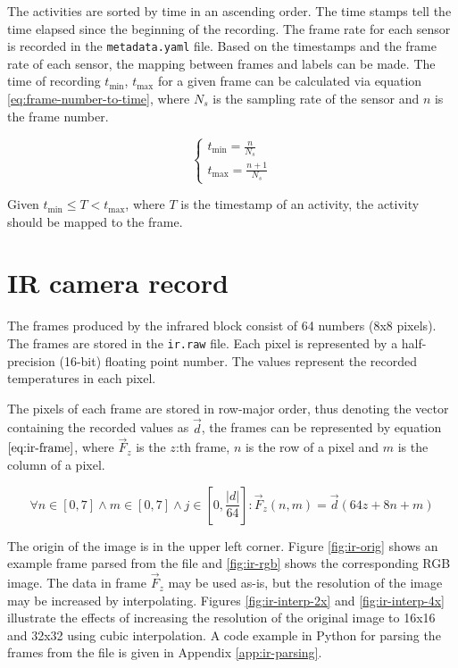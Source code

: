 The activities are sorted by time in an ascending order.
The time stamps tell the time elapsed since the beginning of the recording.
The frame rate for each sensor is recorded in the \texttt{metadata.yaml} file.
Based on the timestamps and the frame rate of each sensor, the mapping between frames and labels can be made.
The time of recording $t_{\mathrm{min}}$, $t_{\mathrm{max}}$ for a given frame can be calculated via equation \ref{eq:frame-number-to-time},
where $N_{s}$ is the sampling rate of the sensor and $n$ is the frame number.

\begin{equation}
    \label{eq:frame-number-to-time}
    \begin{cases}
        t_{\mathrm{min}} = \frac{n}{N_{s}} \\
        t_{\mathrm{max}} = \frac{n+1}{N_{s}}
    \end{cases}
\end{equation}

Given $t_{\mathrm{min}} \leq T < t_{\mathrm{max}}$, where $T$ is the timestamp of an activity, the activity should be mapped to the frame.

\section{IR camera record}
\label{sec:ir-file}
The frames produced by the infrared block consist of 64 numbers (8x8 pixels).
The frames are stored in the \texttt{ir.raw} file.
Each pixel is represented by a half-precision (16-bit) floating point number.
The values represent the recorded temperatures in each pixel.

The pixels of each frame are stored in row-major order,
thus denoting the vector containing the recorded values as $\vec{d}$,
the frames can be represented by equation $\ref{eq:ir-frame}$,
where $\vec{F}_{z}$ is the $z$:th frame, $n$ is the row of a pixel and $m$ is the column of a pixel.

\begin{equation}
    \label{eq:ir-frame}
    \forall n \in [0, 7] \land m \in [0, 7] \land j \in \left[ 0, \frac{|d|}{64} \right] : \vec{F}_{z}(n, m) = \vec{d}(64z+8n+m)
\end{equation}

The origin of the image is in the upper left corner.
Figure \ref{fig:ir-orig} shows an example frame parsed from the file and \ref{fig:ir-rgb} shows the corresponding RGB image.
The data in frame $\vec{F}_z$  may be used as-is, but the resolution of the image may be increased by interpolating.
Figures \ref{fig:ir-interp-2x} and \ref{fig:ir-interp-4x} illustrate the effects of increasing the resolution of the original image
to 16x16 and 32x32 using cubic interpolation.
A code example in Python for parsing the frames from the file is given in Appendix \ref{app:ir-parsing}.

